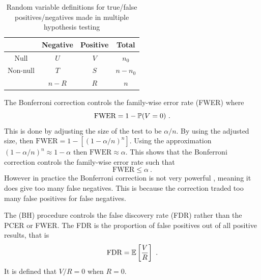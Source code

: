 \begin{table}
  \centering
  \begin{tabular}{c|c|c|c}
    &Negative&Positive&Total\\\hline
    Null & $U$ & $V$ & $n_0$\\
    Non-null & $T$ & $S$ & $n-n_0$\\\hline
    &$n-R$&$R$&$n$
  \end{tabular}
  \caption{Random variable definitions for true/false positives/negatives made in multiple hypothesis testing}
  \label{table:inference_randomvariables}
\end{table} 

The Bonferroni correction \citep{shaffer1995multiple, bland1995multiple, perneger1998what} controls the family-wise error rate (FWER) \citep{shaffer1995multiple} where
\begin{equation}
  \text{FWER} = 1-\operatorname{\mathbb{P}}(V=0) \ .
  \label{eq:inference_fwer}
\end{equation}
This is done by adjusting the size of the test to be $\alpha/n$. By using the adjusted size, then $\text{FWER}=1-\left[(1-\alpha/n)^n\right]$. Using the approximation $(1-\alpha/n)^n\approx 1-\alpha$ then $\text{FWER}\approx \alpha$. This shows that the Bonferroni correction controls the family-wise error rate such that
\begin{equation}
  \text{FWER} \leqslant \alpha \ .
\end{equation}
However in practice the Bonferroni correction is not very powerful \citep{perneger1998what}, meaning it does give too many false negatives. This is because the correction traded too many false positives for false negatives.

The \cite{benjamini1995controlling} (BH) procedure controls the false discovery rate (FDR) \citep{benjamini2010discovering} rather than the PCER or FWER. The FDR is the proportion of false positives out of all positive results, that is
\begin{equation}
  \text{FDR} = \operatorname{\mathbb{E}}\left[\dfrac{V}{R}\right]
  \ .
\end{equation}
It is defined that $V/R=0$ when $R=0$.

